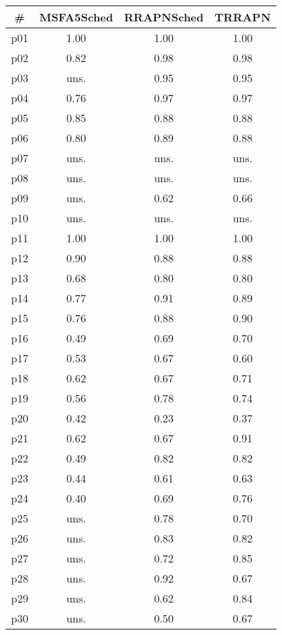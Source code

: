\begin{tabular}{c||c|c|c}
\textbf{\#} & \textbf{MSFA5Sched} & \textbf{RRAPNSched} & \textbf{TRRAPN}\\
\hline
\hline
p01 & 1.00 & 1.00 & 1.00\\
p02 & 0.82 & 0.98 & 0.98\\
p03 & uns. & 0.95 & 0.95\\
p04 & 0.76 & 0.97 & 0.97\\
p05 & 0.85 & 0.88 & 0.88\\
p06 & 0.80 & 0.89 & 0.88\\
p07 & uns. & uns. & uns.\\
p08 & uns. & uns. & uns.\\
p09 & uns. & 0.62 & 0.66\\
p10 & uns. & uns. & uns.\\
p11 & 1.00 & 1.00 & 1.00\\
p12 & 0.90 & 0.88 & 0.88\\
p13 & 0.68 & 0.80 & 0.80\\
p14 & 0.77 & 0.91 & 0.89\\
p15 & 0.76 & 0.88 & 0.90\\
p16 & 0.49 & 0.69 & 0.70\\
p17 & 0.53 & 0.67 & 0.60\\
p18 & 0.62 & 0.67 & 0.71\\
p19 & 0.56 & 0.78 & 0.74\\
p20 & 0.42 & 0.23 & 0.37\\
p21 & 0.62 & 0.67 & 0.91\\
p22 & 0.49 & 0.82 & 0.82\\
p23 & 0.44 & 0.61 & 0.63\\
p24 & 0.40 & 0.69 & 0.76\\
p25 & uns. & 0.78 & 0.70\\
p26 & uns. & 0.83 & 0.82\\
p27 & uns. & 0.72 & 0.85\\
p28 & uns. & 0.92 & 0.67\\
p29 & uns. & 0.62 & 0.84\\
p30 & uns. & 0.50 & 0.67\\
\end{tabular}

